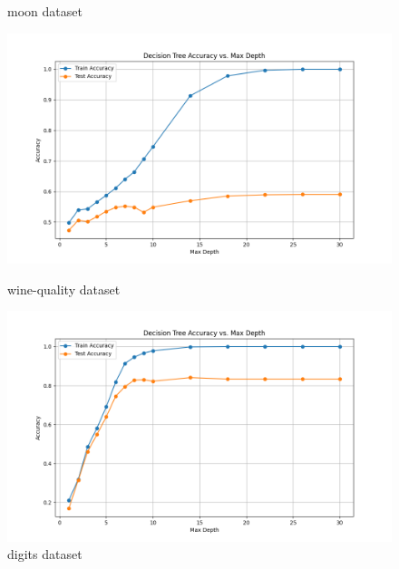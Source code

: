 \documentclass[8pt]{article}
\begin{document}
\begin{figure}[H]
\begin{minipage}{0.32\textwidth}
        \caption{moon dataset}
        \label{fig:AccuracyVsMaxDepth_30 on moon dataset}
    \end{minipage}
    \begin{minipage}{0.32\textwidth}
        \centering
        \includegraphics[width=\textwidth]{../Prob2/out/task2/allwine/AccuracyVsMaxDepth_30.png}
        \caption{wine-quality dataset}
        \label{fig:AccuracyVsMaxDepth_30 on wine_quality dataset}
    \end{minipage}
    \begin{minipage}{0.32\textwidth}
        \centering
        \includegraphics[width=\textwidth]{../Prob2/out/task2/digits/AccuracyVsMaxDepth_30.png}
        \caption{digits dataset}
        \label{fig:AccuracyVsMaxDepth_30 on digits dataset}
    \end{minipage}
    \begin{minipage}{0.32\textwidth}
        \centering

\end{minipage}
\end{figure}
\end{document}
